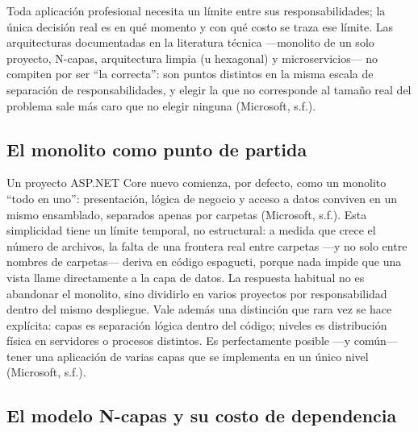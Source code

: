 \documentclass[
  spanish,
  12pt,
  letterpaper,
]{article}
\begin{document}
Toda aplicación profesional necesita un límite entre sus
responsabilidades; la única decisión real es en qué momento y con qué
costo se traza ese límite. Las arquitecturas documentadas en la
literatura técnica ---monolito de un solo proyecto, N-capas,
arquitectura limpia (u hexagonal) y microservicios--- no compiten por
ser ``la correcta'': son puntos distintos en la misma escala de
separación de responsabilidades, y elegir la que no corresponde al
tamaño real del problema sale más caro que no elegir ninguna (Microsoft,
s.f.).

\subsection{El monolito como punto de
partida}\label{el-monolito-como-punto-de-partida}

Un proyecto ASP.NET Core nuevo comienza, por defecto, como un monolito
``todo en uno'': presentación, lógica de negocio y acceso a datos
conviven en un mismo ensamblado, separados apenas por carpetas
(Microsoft, s.f.). Esta simplicidad tiene un límite temporal, no
estructural: a medida que crece el número de archivos, la falta de una
frontera real entre carpetas ---y no solo entre nombres de carpetas---
deriva en código espagueti, porque nada impide que una vista llame
directamente a la capa de datos. La respuesta habitual no es abandonar
el monolito, sino dividirlo en varios proyectos por responsabilidad
dentro del mismo despliegue. Vale además una distinción que rara vez se
hace explícita: capas es separación lógica dentro del código; niveles es
distribución física en servidores o procesos distintos. Es perfectamente
posible ---y común--- tener una aplicación de varias capas que se
implementa en un único nivel (Microsoft, s.f.).

\subsection{El modelo N-capas y su costo de
dependencia}\label{el-modelo-n-capas-y-su-costo-de-dependencia}
\end{document}
